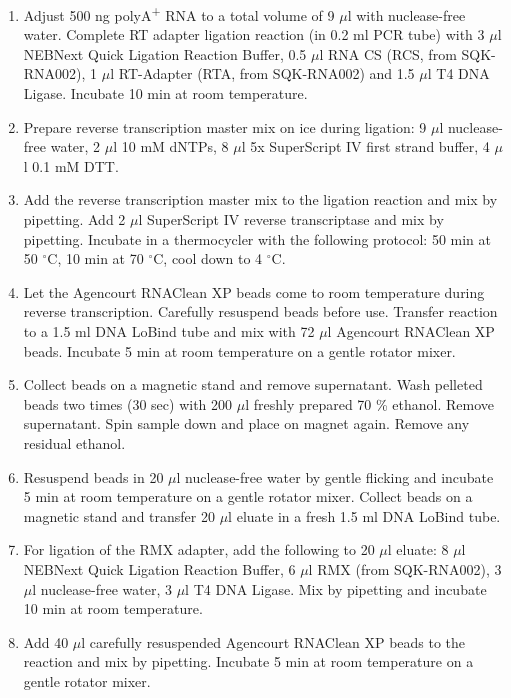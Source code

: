 \documentclass[times, 11pt, a4paper]{article}
\begin{document}
\begin{enumerate}
\item Adjust 500 ng polyA\textsuperscript{+} RNA to a total volume of 9 $\mu$l with nuclease-free water. Complete RT adapter ligation reaction (in 0.2 ml PCR tube) with 3 $\mu$l NEBNext Quick Ligation Reaction Buffer, 0.5 $\mu$l RNA CS (RCS, from SQK-RNA002), 1 $\mu$l RT-Adapter (RTA, from SQK-RNA002) and 1.5 $\mu$l T4 DNA Ligase. Incubate 10 min at room temperature.

\item Prepare reverse transcription master mix on ice during ligation: 9 $\mu$l nuclease-free water, 2 $\mu$l 10 mM dNTPs, 8 $\mu$l 5x SuperScript IV first strand buffer, 4 $\mu$l 0.1 mM DTT.

\item Add the reverse transcription master mix to the ligation reaction and mix by pipetting. Add 2 $\mu$l SuperScript IV reverse transcriptase and mix by pipetting. Incubate in a thermocycler with the following protocol: 50 min at 50 $^{\circ}$C, 10 min at 70 $^{\circ}$C, cool down to 4 $^{\circ}$C.

\item Let the Agencourt RNAClean XP beads come to room temperature during reverse transcription. Carefully resuspend beads before use. Transfer reaction to a 1.5 ml DNA LoBind tube and mix with 72 $\mu$l Agencourt RNAClean XP beads. Incubate 5 min at room temperature on a gentle rotator mixer.

\item Collect beads on a magnetic stand and remove supernatant. Wash pelleted beads two times (30 sec) with 200 $\mu$l freshly prepared 70 \% ethanol. Remove supernatant. Spin sample down and place on magnet again. Remove any residual ethanol. 

\item Resuspend beads in 20 $\mu$l nuclease-free water by gentle flicking and incubate 5 min at room temperature on a gentle rotator mixer. Collect beads on a magnetic stand and transfer 20 $\mu$l eluate in a fresh 1.5 ml DNA LoBind tube.

\item For ligation of the RMX adapter, add the following to 20 $\mu$l eluate: 8 $\mu$l NEBNext Quick Ligation Reaction Buffer, 6 $\mu$l RMX (from SQK-RNA002), 3 $\mu$l nuclease-free water, 3 $\mu$l T4 DNA Ligase. Mix by pipetting and incubate 10 min at room temperature.

\item Add 40 $\mu$l carefully resuspended Agencourt RNAClean XP beads to the reaction and mix by pipetting. Incubate 5 min at room temperature on a gentle rotator mixer.


\end{enumerate}
\end{document}
